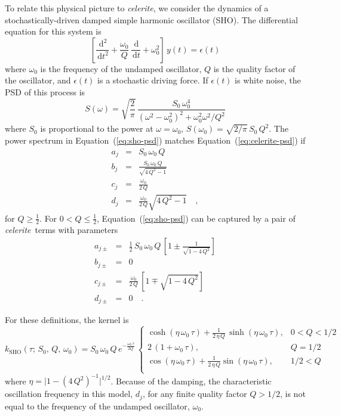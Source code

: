 \documentclass[manuscript, letterpaper]{aastex6}
\newcommand{\celeriteterm}{\emph{celerite}}
\renewcommand{\eqref}[1]{\ref{eq:#1}}
\newcommand{\Eq}[1]{Equation~(\eqref{#1})}
\newcommand{\eq}[1]{\Eq{#1}}
\newcommand{\eqlabel}[1]{\label{eq:#1}}
\newcommand{\dd}{\ensuremath{\,\mathrm{d}}}
\begin{document}
To relate this physical picture to \celeriteterm, we consider the dynamics of a
stochastically-driven damped simple harmonic oscillator (SHO).
The differential equation for this system is
\begin{equation}
    \left[\frac{\dd^2}{\dd t^2} + \frac{\omega_0}{Q}\,\frac{\dd}{\dd t}
    + \omega_0^2\right]\, y(t) = \epsilon(t)
\end{equation}
where $\omega_0$ is the frequency of the undamped oscillator, $Q$ is the
quality factor of the oscillator, and $\epsilon(t)$ is a stochastic driving
force.
If $\epsilon(t)$ is white noise, the PSD of this process is
\citep{Anderson:1990}
\begin{equation}\eqlabel{sho-psd}
S(\omega) = \sqrt{\frac{2}{\pi}}\,\frac{S_0\,\omega_0^4}
    {(\omega^2-\omega_0^2)^2 + \omega_0^2\omega^2/Q^2}
\end{equation}
where $S_0$ is proportional to the power at $\omega = \omega_0$, $S(\omega_0)
= \sqrt{2/\pi}\,S_0\,Q^2$.
The power spectrum in \eq{sho-psd} matches \eq{celerite-psd} if
\begin{eqnarray}\eqlabel{sho-complex}
a_j &=& S_0\,\omega_0\,Q \\
b_j &=& \frac{S_0\,\omega_0\,Q}{\sqrt{4\,Q^2-1}} \\
c_j &=& \frac{\omega_0}{2\,Q}\\
d_j &=& \frac{\omega_0}{2\,Q} \sqrt{4\,Q^2-1} \quad,
\end{eqnarray}
for $Q \ge \frac{1}{2}$.
For $0 < Q \le \frac{1}{2}$, \eq{sho-psd} can be captured by a pair of
\celeriteterm\
terms with parameters
\begin{eqnarray}\eqlabel{sho-real}
a_{j\pm} &=& \frac{1}{2}\,S_0\,\omega_0\,Q\,\left[ 1 \pm
        \frac{1}{\sqrt{1-4\,Q^2}}\right] \\
b_{j\pm} &=& 0 \nonumber\\
    c_{j\pm} &=& \frac{\omega_0}{2\,Q}\,\left[1 \mp \sqrt{1-4\,Q^2}\right]
    \nonumber\\
d_{j\pm} &=& 0 \quad. \nonumber
\end{eqnarray}

For these definitions, the kernel is
\begin{equation}\eqlabel{sho-kernel}
k_\mathrm{SHO}(\tau;\,S_0,\,Q,\,\omega_0) =
S_0\,\omega_0\,Q\,e^{-\frac{\omega_0\,\tau}{2Q}}\,
\begin{cases}
    \cosh{(\eta\,\omega_0\,\tau)} +
        \frac{1}{2\,\eta\,Q}\,\sinh{(\eta\,\omega_0\,\tau)}, & 0 < Q < 1/2\\
    2\,(1+\omega_0\,\tau), & Q = 1/2\\
    \cos{(\eta\,\omega_0\,\tau)} +
        \frac{1}{2\,\eta\,Q} \sin{(\eta\,\omega_0\,\tau)},& 1/2 < Q\\
\end{cases}
\end{equation}
where $\eta = \vert 1-(4\,Q^2)^{-1}\vert^{1/2}$.
Because of the damping, the characteristic oscillation frequency in this
model, $d_j$, for any finite quality factor $Q > 1/2$, is not equal to the
frequency of the undamped oscillator, $\omega_0$.
\end{document}

